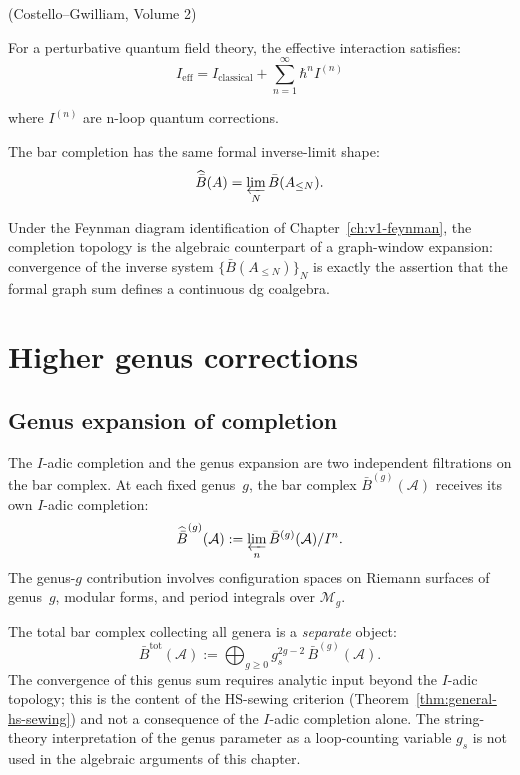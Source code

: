 \begin{theorem}\label{thm:CG-renorm}
\textup{(Costello--Gwilliam, Volume 2)}

For a perturbative quantum field theory, the effective interaction satisfies:
\[I_{\text{eff}} = I_{\text{classical}} + \sum_{n=1}^{\infty} \hbar^n I^{(n)}\]

where $I^{(n)}$ are n-loop quantum corrections.

The bar completion has the same formal inverse-limit shape:
\[
\widehat{\bar B}(A)=\varprojlim_N\bar B(A_{\le N}).
\]

\end{theorem}

\begin{remark}
Under the Feynman diagram identification of Chapter~\ref{ch:v1-feynman},
the completion topology is the algebraic counterpart of a graph-window
expansion: convergence of the inverse system
$\{\bar B(A_{\le N})\}_N$ is exactly the assertion that the formal
graph sum defines a continuous dg coalgebra.
\end{remark}

\section{Higher genus corrections}

\subsection{Genus expansion of completion}

\begin{remark}\label{rem:genus-completion}
The $I$-adic completion and the genus expansion are two independent filtrations on
the bar complex. At each fixed genus~$g$, the bar complex
$\bar{B}^{(g)}(\mathcal{A})$ receives its own $I$-adic completion:
\[\widehat{\bar{B}}^{(g)}(\mathcal{A}) := \varprojlim_n \bar{B}^{(g)}(\mathcal{A})/I^n.\]
The genus-$g$ contribution involves configuration spaces on Riemann surfaces of
genus~$g$, modular forms, and period integrals over $\mathcal{M}_g$.

The total bar complex collecting all genera is a \emph{separate} object:
\[\bar{B}^{\mathrm{tot}}(\mathcal{A}) := \bigoplus_{g \geq 0} g_s^{2g-2}\, \bar{B}^{(g)}(\mathcal{A}).\]
The convergence of this genus sum requires analytic input beyond the $I$-adic
topology; this is the content of the HS-sewing criterion
(Theorem~\ref{thm:general-hs-sewing}) and not a consequence of the $I$-adic
completion alone. The string-theory interpretation of the genus parameter as a
loop-counting variable $g_s$ is not used in the algebraic
arguments of this chapter.
\end{remark}

